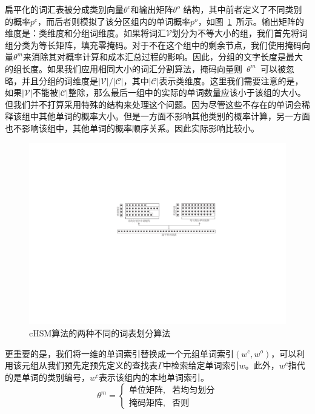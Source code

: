 扁平化的词汇表被分成类别向量$ \theta^c $和输出矩阵$ \theta^o $ 结构，其中前者定义了不同类别的概率$ p ^ c $，而后者则模拟了该分区组内的单词概率$ p ^ o $，如图~\ref {fig:chsm}~所示。输出矩阵的维度是：类维度和分组词维度。如果将词汇$ \mathcal {V} $划分为不等大小的组，我们首先将词组分类为等长矩阵，填充零掩码。对于不在这个组中的剩余节点，我们使用掩码向量$ \theta ^ m $来消除其对概率计算和成本汇总过程的影响。因此，分组的文字长度是最大的组长度。如果我们应用相同大小的词汇分割算法，掩码向量则~$\theta^m$~可以被忽略，并且分组的词维度是$ \mathcal {| V | / | C |} $，其中$ \mathcal {| C |} $表示类维度。这里我们需要注意的是，如果$ \mathcal {| V |} $不能被$ \mathcal {| C |} $整除，那么最后一组中的实际的单词数量应该小于该组的大小。但我们并不打算采用特殊的结构来处理这个问题。因为尽管这些不存在的单词会稀释该组中其他单词的概率大小。但是一方面不影响其他类别的概率计算，另一方面也不影响该组中，其他单词的概率顺序关系。因此实际影响比较小。
\begin{figure}[!ht]
  \centering
\includegraphics[width=0.85\linewidth]{./figures/chsm-simple.pdf}
\caption{cHSM算法的两种不同的词表划分算法}\label{fig:chsm}
\end{figure}


更重要的是，我们将一维的单词索引替换成一个元组单词索引$(w ^ c,w ^ o)$，可以利用该元组从我们预先定预先定义的查找表$\Gamma $中检索给定单词索引$ w $。此外，$ w ^ c $指代的是单词的类别编号，$ w^c $表示该组内的本地单词索引。
\begin{equation}\label{equ:partition}
 \theta^m=
\begin{cases}
    \text{单位矩阵} ,& \text{若均匀划分} \\
    \text{掩码矩阵},   & \text{否则}
\end{cases}
\end{equation}


